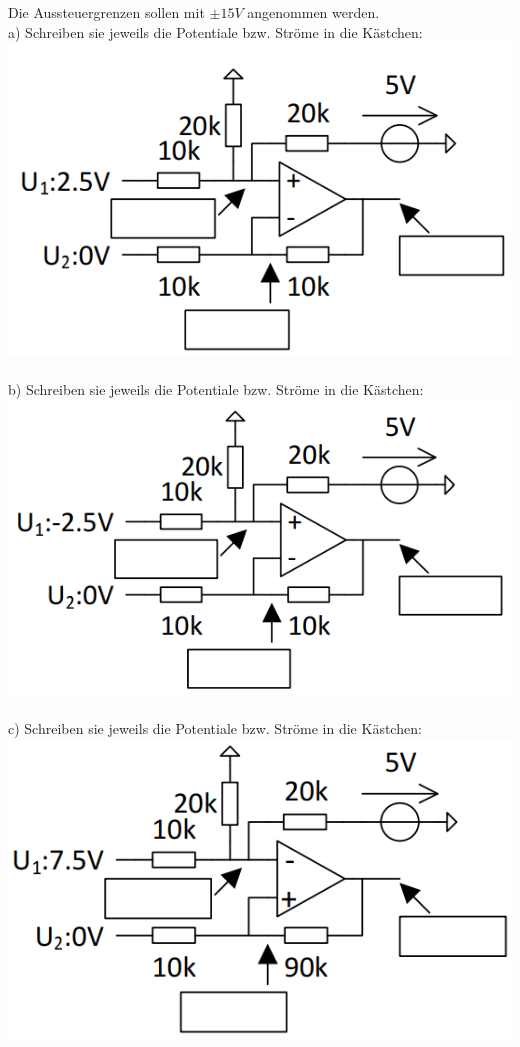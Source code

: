 \documentclass[A4]{scrreprt}
\begin{document}
  Die Aussteuergrenzen sollen mit $\pm 15V$ angenommen werden.\\
  a) Schreiben sie jeweils die Potentiale bzw. Ströme in die Kästchen:\\
  \includegraphics{Schaltung2.png}\\\\
  b) Schreiben sie jeweils die Potentiale bzw. Ströme in die Kästchen:\\
  \includegraphics{Schaltung3.png}\\\\
  c) Schreiben sie jeweils die Potentiale bzw. Ströme in die Kästchen:\\
  \includegraphics{Schaltung4.png}\\\\
\end{document}
